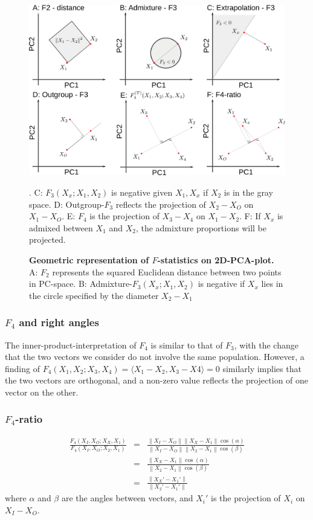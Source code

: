 \documentclass[10pt,a4paper]{article}
\newcommand{\norm}[1]{\left\lVert#1\right\rVert}
\begin{document}
\begin{figure}[!ht]
	\includegraphics[width=\textwidth]{dummy_pca.png}
	\caption{\textbf{Geometric representation of $F$-statistics on 2D-PCA-plot.} A: $F_2$ represents the squared Euclidean distance between two points in PC-space. B: Admixture-$F_3(X_x; X_1, X_2)$ is negative if $X_x$ lies in the circle specified by the diameter $X_2-X_1$}. C: $F_3(X_x; X_1, X_2)$ is negative given $X_1, X_x$ if $X_2$ is in the gray space.  D: Outgroup-$F_3$ reflects the projection of $X_2 - X_O$ on $X_1 - X_O$. E: $F_4$ is the projection of $X_3 - X_4$ on $X_1-X_2$. F: If $X_x$ is admixed between $X_1$ and $X_2$, the admixture proportions will be projected.
\end{figure}

\subsubsection{$F_4$ and right angles}
The inner-product-interpretation of $F_4$ is similar to that of $F_3$, with the change that the two vectors we consider do not involve the same population. However, a finding of $F_4(X_1, X_2; X_3, X_4) = \langle X_1 - X_2, X_3 - X4 \rangle = 0$ similarly implies that the two vectors are orthogonal, and a non-zero value reflects the projection of one vector on the other.

\subsubsection{$F_4$-ratio}
\begin{eqnarray}
\frac{F_4(X_I, X_O; X_X, X_1)}{F_4(X_I, X_O; X_2, X_1)} &=& \frac{\norm{X_I-X_O}\norm{X_X-X_1}\cos(\alpha)}{\norm{X_I-X_O}\norm{X_2-X_1}\cos(\beta)}\nonumber\\
&=&\frac{\norm{X_X-X_1}\cos(\alpha)}{\norm{X_2-X_1}\cos(\beta)}\nonumber\\
&=& \frac{\norm{X_X' - X_1'}}{\norm{X_2' - X_1'}}
\end{eqnarray}
where $\alpha$ and $\beta$ are the angles between vectors, and $X_i'$ is the projection of $X_i$ on $X_I-X_O$.
\end{document}
